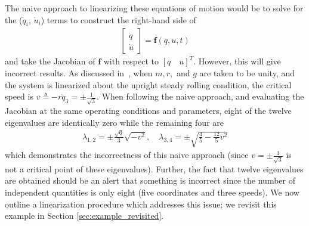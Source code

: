 The naive approach to linearizing these equations of motion would be to solve
for the ($\dot{q}_i$, $\dot{u}_i$) terms to construct the right-hand side of
\begin{align}
\begin{bmatrix}\dot{{q}} \\ \dot{{u}}\end{bmatrix} =
    \mathbf{f}({q}, {u}, t)
\end{align}
and take the Jacobian of $\mathbf{f}$ with respect to $[{q} \quad {u}]^T$.
However, this will give incorrect results. As discussed in~\cite{Schwab2003},
when $m, r,$ and $g$ are taken to be unity, and the system is linearized about
the upright steady rolling condition, the critical speed is $v \triangleq
-r\dot{q}_3 =\pm\frac{1}{\sqrt{3}}$. When following the naive approach, and
evaluating the Jacobian at the same operating conditions and parameters, eight
of the twelve eigenvalues are identically zero while the remaining four are
\begin{align}
  \label{eq:evals_incorrect}
  \lambda_{1,2}=\pm\frac{\sqrt{6}}{3}\sqrt{-v^2},
  \quad \lambda_{3,4} = \pm\sqrt{\frac{4}{5} - \frac{12}{5} v^2}
\end{align}
which demonstrates the incorrectness of this naive approach (since
$v=\pm\frac{1}{\sqrt{3}}$ is not a critical point of these eigenvalues).
Further, the fact that twelve eigenvalues are obtained should be an alert that
something is incorrect since the number of independent quantities is only eight
(five coordinates and three speeds). We now outline a linearization procedure
which addresses this issue; we revisit this example in Section
\ref{sec:example_revisited}.

